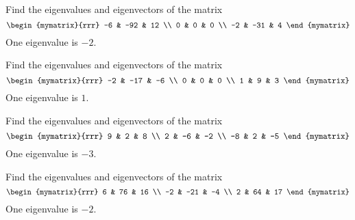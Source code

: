 \begin{enumialphparenastyle}

\begin{ex} Find the eigenvalues and eigenvectors of the matrix 
\begin{equation*}
\begin{mymatrix}{rrr}
-6 & -92 & 12 \\
0 & 0 & 0 \\
-2 & -31 & 4
\end{mymatrix}
\end{equation*}
One eigenvalue is $-2$.
\end{ex}


\begin{ex} Find the eigenvalues and eigenvectors of the matrix 
\begin{equation*}
\begin{mymatrix}{rrr}
-2 & -17 & -6 \\
0 & 0 & 0 \\
1 & 9 & 3
\end{mymatrix}
\end{equation*}
One eigenvalue is $1.$ 
\end{ex}

\begin{ex} Find the eigenvalues and eigenvectors of the matrix 
\begin{equation*}
\begin{mymatrix}{rrr}
9 & 2 & 8 \\
2 & -6 & -2 \\
-8 & 2 & -5
\end{mymatrix}
\end{equation*}
One eigenvalue is $-3.$ 
\end{ex}

\begin{ex} Find the eigenvalues and eigenvectors of the matrix 
\begin{equation*}
\begin{mymatrix}{rrr}
6 & 76 & 16 \\
-2 & -21 & -4 \\
2 & 64 & 17
\end{mymatrix}
\end{equation*}
One eigenvalue is $-2.$ 
\end{ex}


\end{enumialphparenastyle}
